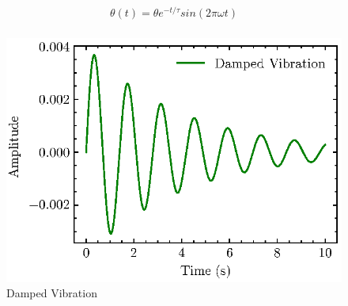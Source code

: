 \begin{equation}
  \label{eqn:vib_rot}
  \begin{aligned}
    \theta(t) = \theta e^{-t/\tau}sin(2\pi\omega t) \\
  \end{aligned}
\end{equation}

\begin{figure}[H]
    \centering
    \includegraphics{images/fig_chapter4/vib_damped.eps}
    \caption{Damped Vibration}
    \label{fig:damped_vib}
\end{figure}

